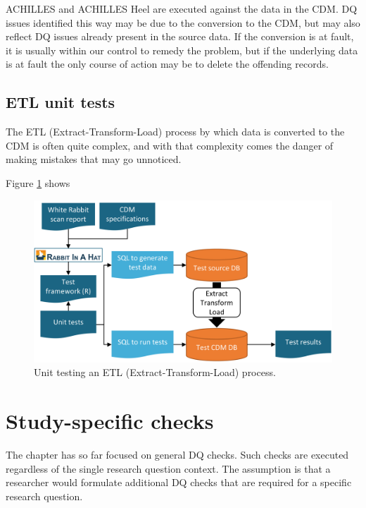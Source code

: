 \documentclass[11pt]{book}
\theoremstyle{definition}
\theoremstyle{definition}
\theoremstyle{definition}
\theoremstyle{remark}
\let\BeginKnitrBlock\begin \let\EndKnitrBlock\end
\begin{document}
\BeginKnitrBlock{rmdimportant}
ACHILLES and ACHILLES Heel are executed against the data in the CDM. DQ issues identified this way may be due to the conversion to the CDM, but may also reflect DQ issues already present in the source data. If the conversion is at fault, it is usually within our control to remedy the problem, but if the underlying data is at fault the only course of action may be to delete the offending records.
\EndKnitrBlock{rmdimportant}

\hypertarget{etl-unit-tests}{%
\subsection{ETL unit tests}\label{etl-unit-tests}}

The ETL (Extract-Transform-Load) process by which data is converted to the CDM is often quite complex, and with that complexity comes the danger of making mistakes that may go unnoticed.

Figure \ref{fig:testFramework} shows

\begin{figure}

{\centering \includegraphics[width=0.9\linewidth]{images/DataQuality/testFramework} 

}

\caption{Unit testing an ETL (Extract-Transform-Load) process.}\label{fig:testFramework}
\end{figure}

\hypertarget{study-specific-checks}{%
\section{Study-specific checks}\label{study-specific-checks}}

The chapter has so far focused on general DQ checks. Such checks are executed regardless of the single research question context. The assumption is that a researcher would formulate additional DQ checks that are required for a specific research question.
\end{document}
